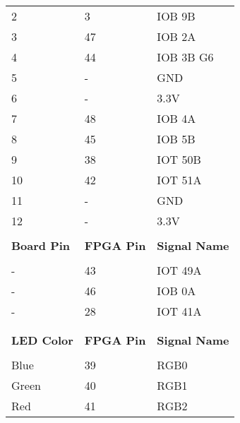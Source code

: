 \begin{table}[h!]
\begin{tabular}[t]{C{0.12\textwidth} C{0.12\textwidth} C{0.15\textwidth}}
		2 & 3 & IOB 9B \\
		3 & 47 & IOB 2A \\
		4 & 44 & IOB 3B G6 \\
		5 & - & GND \\
		6 & - & 3.3V \\
		7 & 48 & IOB 4A \\
		8 & 45 & IOB 5B \\
		9 & 38 & IOT 50B \\
		10 & 42 & IOT 51A \\
		11 & - & GND \\
		12 & - & 3.3V \\
		& & \\
		\bfseries Board Pin & \bfseries FPGA Pin & \bfseries Signal Name \\ \hline
		  \\ \hline
		 - & 43 & IOT 49A \\
		- & 46 & IOB 0A \\
		- & 28 & IOT 41A \\	
		& & \\
		& & \\
		\bfseries LED Color & \bfseries FPGA Pin & \bfseries Signal Name \\ \hline
		  \\   \hline
		Blue & 39 & RGB0 \\
		Green & 40 & RGB1 \\
		Red & 41 & RGB2 \\
	\end{tabular}
\end{table}

